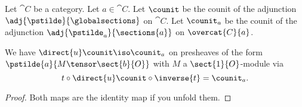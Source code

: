 Let $\cat{C}$ be a category.
Let $a\in \cat{C}$.
Let $\counit$ be the counit of the adjunction $\adj{\pstilde}{\globalsections}$ on $\cat{C}$.
Let $\counit_a$ be the counit of the adjunction $\adj{\pstilde_a}{\sections{a}}$ on $\overcat{C}{a}$.
\begin{lemma}
We have $\direct{u}\counit \iso \counit_a$ on 
presheaves of the form $\pstilde{a}{M\tensor \sect{b}{O}}$
with $M$ a $\sect{1}{O}$-module
via 
\[t \circ \direct{u}\counit \circ \inverse{t} 
	= \counit_{a}.\]
\end{lemma}

\begin{proof}
Both maps are the identity map if you unfold them.
\end{proof}